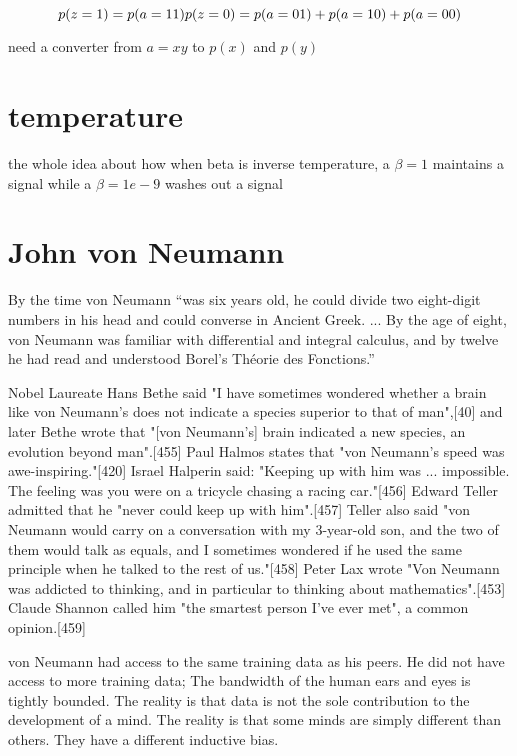 \begin{equation}
    p(z=1) = p(a=11) \\
    p(z=0) = p(a=01) + p(a=10) + p(a=00) \\
\end{equation}

need a converter from $a=xy$ to $p(x)$ and $p(y)$


\section{temperature}

the whole idea about how when beta is inverse
temperature, a $\beta = 1$ maintains a signal
while a $\beta= 1e-9$ washes out a signal

\section{John von Neumann}

By the time von Neumann ``was six years old, he could divide two eight-digit numbers in his head and could converse in Ancient Greek. ... By the age of eight, von Neumann was familiar with differential and integral calculus, and by twelve he had read and understood Borel's Théorie des Fonctions.''

Nobel Laureate Hans Bethe said "I have sometimes wondered whether a brain like von Neumann's does not indicate a species superior to that of man",[40] and later Bethe wrote that "[von Neumann's] brain indicated a new species, an evolution beyond man".[455] Paul Halmos states that "von Neumann's speed was awe-inspiring."[420] Israel Halperin said: "Keeping up with him was ... impossible. The feeling was you were on a tricycle chasing a racing car."[456] Edward Teller admitted that he "never could keep up with him".[457] Teller also said "von Neumann would carry on a conversation with my 3-year-old son, and the two of them would talk as equals, and I sometimes wondered if he used the same principle when he talked to the rest of us."[458] Peter Lax wrote "Von Neumann was addicted to thinking, and in particular to thinking about mathematics".[453] Claude Shannon called him "the smartest person I've ever met", a common opinion.[459]

von Neumann had access to the same training data as his peers.  He did not have access to more training data; The bandwidth of the human ears and eyes is tightly bounded.  The reality is that data is not the sole contribution to the development of a mind.  The reality is that some minds are simply different than others.  They have a different inductive bias.


